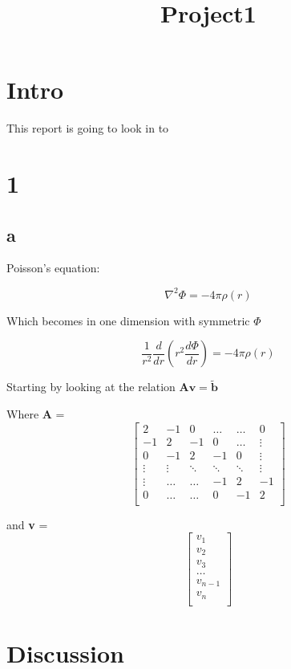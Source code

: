 \documentclass[12pt]{article}
\begin{document}
\title{Project1}


\section*{Intro}

This report is going to look in to 


\section*{1}

\subsection*{a}
Poisson's equation: 

\begin{equation}
 \nabla^2 \Phi = -4\pi \rho(r)
\end{equation}


Which becomes in one dimension with symmetric $\Phi$ 

\begin{equation}
\frac{1}{r^2} \frac{d}{dr}(r^2\frac{d\Phi}{dr}) = -4\pi \rho(r)
\end{equation}


Starting by looking at the relation 
$\textbf{Av} = \tilde{\textbf{b}}$

Where \textbf{A} =
$$
\begin{bmatrix}
2 & -1 & 0 & \ldots & \ldots & 0 \\
-1 & 2 & -1 & 0 &\ldots & \vdots \\ 
0 & -1 & 2 & -1 & 0 & \vdots \\
\vdots & \vdots & \ddots & \ddots & \ddots & \vdots\\ 
\vdots & \ldots & \ldots & -1 & 2 & -1\\
0 & \ldots & \ldots & 0 & -1 & 2\\
\end{bmatrix}
$$

and \textbf{v} = $$\begin{bmatrix}
v_1\\
v_2\\
v_3\\
\ldots\\
v_{n-1}\\
v_{n}\\
\end{bmatrix}
$$





\section*{Discussion}
\end{document}
